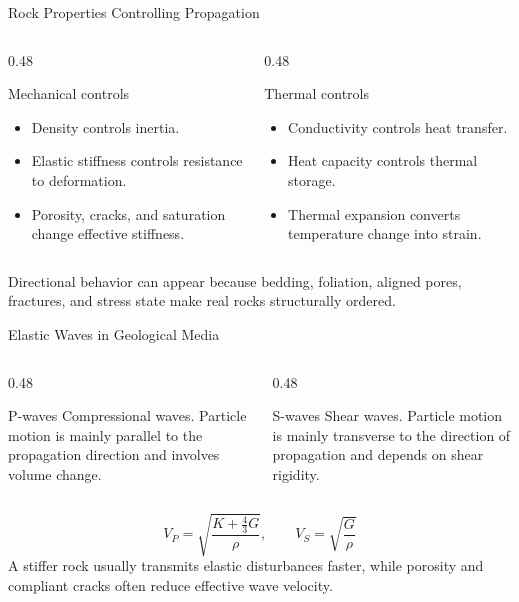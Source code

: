 \documentclass[aspectratio=169,10pt]{beamer}
\begin{document}
\begin{frame}{Rock Properties Controlling Propagation}
  \begin{columns}[T]
    \begin{column}{0.48\textwidth}
      \begin{block}{Mechanical controls}
        \begin{itemize}
          \item Density controls inertia.
          \item Elastic stiffness controls resistance to deformation.
          \item Porosity, cracks, and saturation change effective stiffness.
        \end{itemize}
      \end{block}
    \end{column}
    \begin{column}{0.48\textwidth}
      \begin{block}{Thermal controls}
        \begin{itemize}
          \item Conductivity controls heat transfer.
          \item Heat capacity controls thermal storage.
          \item Thermal expansion converts temperature change into strain.
        \end{itemize}
      \end{block}
    \end{column}
  \end{columns}
  \vskip 6pt
  Directional behavior can appear because bedding, foliation, aligned
  pores, fractures, and stress state make real rocks structurally ordered.
\end{frame}

\begin{frame}{Elastic Waves in Geological Media}
  \begin{columns}[T]
    \begin{column}{0.48\textwidth}
      \begin{block}{P-waves}
        Compressional waves. Particle motion is mainly parallel to the
        propagation direction and involves volume change.
      \end{block}
    \end{column}
    \begin{column}{0.48\textwidth}
      \begin{block}{S-waves}
        Shear waves. Particle motion is mainly transverse to the direction
        of propagation and depends on shear rigidity.
      \end{block}
    \end{column}
  \end{columns}
  \vskip 6pt
  \[
    V_P = \sqrt{\frac{K+\frac{4}{3}G}{\rho}},
    \qquad
    V_S = \sqrt{\frac{G}{\rho}}
  \]
  A stiffer rock usually transmits elastic disturbances faster, while
  porosity and compliant cracks often reduce effective wave velocity.
\end{frame}
\end{document}
